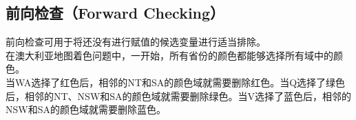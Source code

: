 \vspace{0.5cm}

\subsection{前向检查（Forward Checking）}

前向检查可用于将还没有进行赋值的候选变量进行适当排除。\\

在澳大利亚地图着色问题中，一开始，所有省份的颜色都能够选择所有域中的颜色。\\

当WA选择了红色后，相邻的NT和SA的颜色域就需要删除红色。当Q选择了绿色后，相邻的NT、NSW和SA的颜色域就需要删除绿色。当V选择了蓝色后，相邻的NSW和SA的颜色域就需要删除蓝色。\\

